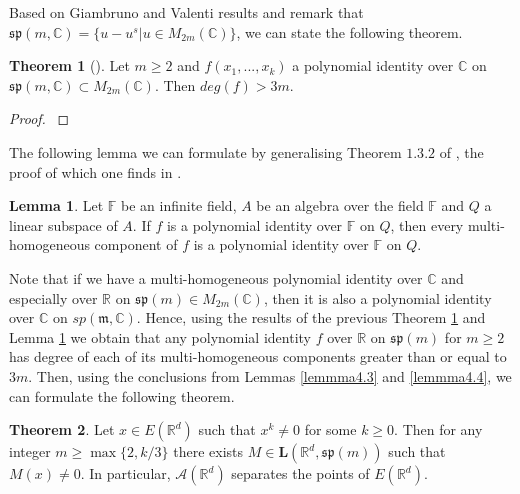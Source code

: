 \documentclass[12pt,a4paper]{report}
\theoremstyle{definition}
\newtheorem{theorem}{Theorem}
\newtheorem{lemma}{Lemma}
\begin{document}
 Based on Giambruno and Valenti \parencite{giambruno1995minimal} results and remark that $\mathfrak{sp}(m,\mathbb{C}) = \{  u-u^s | u \in M_{2m}(\mathbb{C})\}$, we can state the following theorem.\
 
 \begin{theorem}[]
 	\label{thm4.6}
 	Let $m\geq 2$ and $f(x_1, . . . , x_k)$ a polynomial identity
 	over $\mathbb{C}$ on $\mathfrak{sp}(m, \mathbb{C}) \subset M_{2m}(\mathbb{C})$. Then $deg(f) > 3m$.
 \end{theorem}
\begin{proof}
	\parencite[see][]{giambruno1995minimal}
\end{proof}

The following lemma we can formulate by generalising Theorem $1.3.2$ of \parencite{giambruno2005polynomial}, the proof of which one finds in \parencite{chevyrev2016characteristic}.


\begin{lemma}\label{lemmma4.7}
	Let $\mathbb{F}$ be an infinite field, $A$ be an algebra over the field $\mathbb{F}$ and $Q$ a linear subspace of $A$. If $f$ is a polynomial identity over $\mathbb{F}$ on $Q$, then every multi-homogeneous component of $f$ is a polynomial identity over $\mathbb{F}$ on $Q$.
\end{lemma}

Note that if we have a multi-homogeneous polynomial identity over $\mathbb{C}$ and especially over $\mathbb{R}$ on $\mathfrak{sp}(m) \in M_{2m}(\mathbb{C})$, then it is also a polynomial identity over $\mathbb{C}$ on $sp(\mathfrak{m}, \mathbb{C})$. Hence, using the results of the previous Theorem \ref{thm4.6} and Lemma \ref{lemmma4.7} we obtain that any polynomial identity $f$ over $\mathbb{R}$ on $\mathfrak{sp}(m)$ for $m\geq2$ has degree of each of its multi-homogeneous components greater than or equal to $3m$. Then, using the conclusions from Lemmas \ref{lemmma4.3} and \ref{lemmma4.4}, we can formulate the following theorem.

\begin{theorem}\label{thm4.8}\parencite[see proof in][]{chevyrev2016characteristic}
	Let $x \in E(\mathbb{R}^d)$ such that $x^k \neq 0$ for some $k \geq 0$. Then for any integer $m \geq \max\{2, k/3\}$ there exists $M \in \textbf{L}(\mathbb{R}^d, \mathfrak{sp}(m))$ such that $M(x) \neq0$. In 	particular, $\mathcal{A}(\mathbb{R}^d)$ separates the points of $E(\mathbb{R }^d)$.
\end{theorem}
\end{document}
